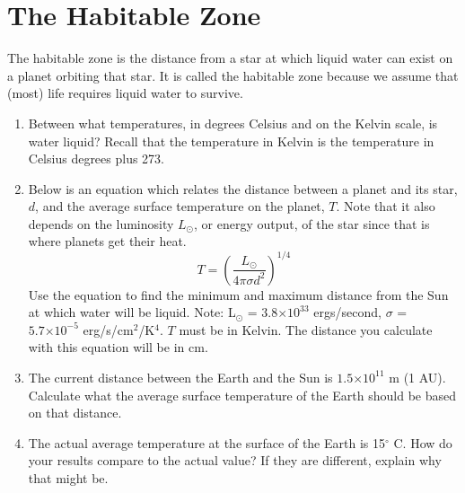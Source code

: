 \documentclass[10pt]{article}%
\providecommand{\e}[1]{\ensuremath{\times 10^{#1}}} %
\begin{document}
\section{The Habitable Zone}

The habitable zone is the distance from a star at which liquid water can exist on a planet orbiting that star.  
It is called the habitable zone because we assume that (most) life requires liquid water to survive.

\begin{enumerate}

\item Between what temperatures, in degrees Celsius and on the Kelvin scale, is water liquid?  
Recall that the temperature in Kelvin is the temperature in Celsius degrees plus 273.

\item Below is an equation which relates the distance between a planet and its star, $d$, and the average surface temperature on the planet, $T$. 
Note that it also depends on the luminosity $L_{\odot}$, or energy output, of the star since that is where planets get their heat.
$$ T = \left( \frac{L_{\odot}}{4 \pi \sigma d^{2}} \right) ^{1/4} $$
Use the equation to find the minimum and maximum distance from the Sun at which water will be liquid.  
Note: L$_{\odot}$ = $3.8 \e{33}$ ergs/second, $\sigma$ = $5.7 \e{-5}$ erg/s/cm$^{2}$/K$^{4}$.  
$T$ must be in Kelvin.  
The distance you calculate with this equation will be in cm.  


\item The current distance between the Earth and the Sun is $1.5 \e{11}$ m (1 AU).  
Calculate what the average surface temperature of the Earth should be based on that distance.


\item The actual average temperature at the surface of the Earth is 15$^{\circ}$ C.  
How do your results compare to the actual value?  
If they are different, explain why that might be.


\end{enumerate}
\end{document}
